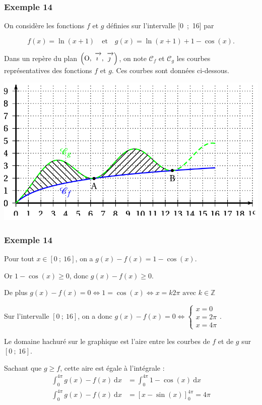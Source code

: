 \documentclass[11pt, hyperref={urlcolor=red,%
            linkcolor=blue, %
            colorlinks=true}]{beamer}
\newcommand{\Z}{\mathbb{Z}}
\newcommand{\dx}{\ensuremath{\text{d}x}}		%
\newcommand{\integralex}[3]{\int_{#1}^{#2} #3 \ \dx}
\def\Oij{\ensuremath{\left(\text{O},~\vect{\imath},~\vect{\jmath}\right)}}
\newcommand{\vect}[1]{\mathchoice%
{\overrightarrow{\displaystyle\mathstrut#1\,\,}}%
{\overrightarrow{\textstyle\mathstrut#1\,\,}}%
{\overrightarrow{\scriptstyle\mathstrut#1\,\,}}%
{\overrightarrow{\scriptscriptstyle\mathstrut#1\,\,}}}
\begin{document}
\begin{frame}
\frametitle{Exemple  14}
\label{exemple14}
On considère les fonctions $f$ et $g$ définies sur l'intervalle [0~;~16] par

\[f(x) = \ln(x + 1)\quad  \text{et}\quad g(x) = \ln(x + 1) + 1 - \cos(x).\]

Dans un repère du plan \Oij, on note $\mathcal{C}_f$ et $\mathcal{C}_g$ les courbes représentatives des fonctions $f$ et $g$. Ces courbes sont données  ci-dessous.


\begin{center}
\includegraphics[scale=0.2]{images/exemple14.png}
\end{center}
\end{frame}



\begin{frame}
\frametitle{Exemple  14}

Pour tout  $x \in [0~;~16]$, on a $g(x)-f(x) =  1 - \cos(x)$.

 Or $1-\cos(x) \geqslant 0$, donc $g(x)-f(x)\geqslant 0$.

 De plus  $g(x)-f(x) = 0 \Leftrightarrow 1 = \cos(x) \Leftrightarrow x = k2\pi \text{ avec } k \in \Z$

Sur l'intervalle $[0~;~16]$, on a donc $g(x)-f(x) = 0 \Leftrightarrow \begin{cases} x = 0 \\ x = 2 \pi \\ x = 4 \pi \end{cases}$.

Le domaine hachuré sur le graphique est l'aire entre les courbes de $f$ et de $g$ sur $[0~;~16]$.

Sachant que $g \geqslant f$, cette aire est égale à l'intégrale :
\pause \begin{align*}
\integralex{0}{4\pi}{g(x)-f(x)} &=\integralex{0}{4\pi}{1-\cos(x)}\\
 \integralex{0}{4\pi}{g(x)-f(x)} &=\left[x-\sin(x)\right]_{0}^{4\pi} = 4\pi
\end{align*}

\end{frame}
\end{document}
